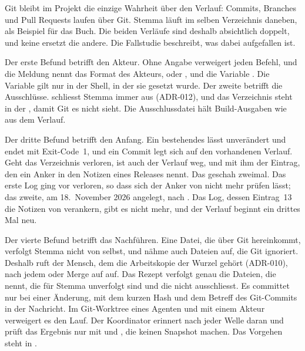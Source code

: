 Git bleibt im Projekt die einzige Wahrheit über den Verlauf: Commits, Branches und Pull Requests
laufen über Git. Stemma läuft im selben Verzeichnis daneben, als Beispiel für das Buch.
Die beiden Verläufe sind deshalb absichtlich doppelt, und keine ersetzt die andere.
Die Fallstudie beschreibt, was dabei aufgefallen ist.

Der erste Befund betrifft den Akteur.
Ohne Angabe verweigert  jeden Befehl, und die Meldung nennt das Format des Akteurs,
 oder , und die Variable
. Die Variable gilt nur in der Shell, in der sie gesetzt wurde.
Der zweite betrifft die Ausschlüsse.  schliesst Stemma immer aus (ADR-012),
und das Verzeichnis  steht in der , damit Git es nicht sieht.
Die Ausschlussdatei  hält Build-Ausgaben wie  aus dem Verlauf.

Der dritte Befund betrifft den Anfang. Ein bestehendes  lässt 
unverändert und endet mit Exit-Code~1, und ein Commit legt sich auf den vorhandenen Verlauf.
Geht das Verzeichnis verloren, ist auch der Verlauf weg, und mit ihm der Eintrag, den ein Anker
in den Notizen eines Releases nennt.
Das geschah zweimal. Das erste Log ging vor  verloren, so dass sich der Anker von
 nicht mehr prüfen lässt; das zweite, am 18.~November 2026 angelegt, nach
. Das Log, dessen Eintrag~13 die Notizen von  verankern, gibt es
nicht mehr, und der Verlauf beginnt ein drittes Mal neu.

Der vierte Befund betrifft das Nachführen.
Eine Datei, die über Git hereinkommt, verfolgt Stemma nicht von selbst, und 
nähme auch Dateien auf, die Git ignoriert.
Deshalb ruft der Mensch, dem die Arbeitskopie der Wurzel gehört (ADR-010),
nach jedem  oder Merge auf   auf.
Das Rezept verfolgt genau die Dateien, die  nennt,
die für Stemma unverfolgt sind und die  nicht ausschliesst.
Es committet nur bei einer Änderung, mit dem kurzen Hash und dem Betreff
des Git-Commits in der Nachricht.
Im Git-Worktree eines Agenten und mit einem Akteur  verweigert es den Lauf.
Der Koordinator erinnert nach jeder Welle daran und prüft das Ergebnis nur mit
 und , die keinen Snapshot machen.
Das Vorgehen steht in .

